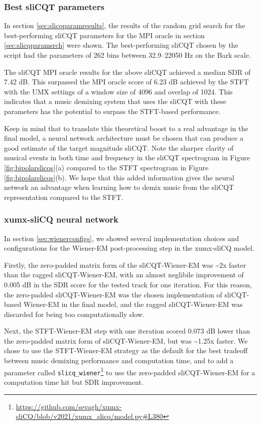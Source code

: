 \documentclass[report.tex]{subfiles}
\begin{document}
\subsubsection{Best sliCQT parameters}

In section \ref{sec:slicqparamresults}, the results of the random grid search for the best-performing sliCQT parameters for the MPI oracle in section \ref{sec:slicqparamsrch} were shown. The best-performing sliCQT chosen by the script had the parameters of 262 bins between 32.9--22050 Hz on the Bark scale.

The sliCQT MPI oracle results for the above sliCQT achieved a median SDR of 7.42 dB. This surpassed the MPI oracle score of 6.23 dB achieved by the STFT with the UMX settings of a window size of 4096 and overlap of 1024. This indicates that a music demixing system that uses the sliCQT with these parameters has the potential to surpass the STFT-based performance.

Keep in mind that to translate this theoretical boost to a real advantage in the final model, a neural network architecture must be chosen that can produce a good estimate of the target magnitude sliCQT. Note the sharper clarity of musical events in both time and frequency in the sliCQT spectrogram in Figure \ref{fig:bipolarslicqs}(a) compared to the STFT spectrogram in Figure \ref{fig:bipolarslicqs}(b). We hope that this added information gives the neural network an advantage when learning how to demix music from the sliCQT representation compared to the STFT.

\subsubsection{xumx-sliCQ neural network}
\label{sec:netdiscuss}

In section \ref{sec:wienerconfigs}, we showed several implementation choices and configurations for the Wiener-EM post-processing step in the xumx-sliCQ model.

Firstly, the zero-padded matrix form of the sliCQT-Wiener-EM was \textasciitilde2x faster than the ragged sliCQT-Wiener-EM, with an almost neglibile improvement of 0.005 dB in the SDR score for the tested track for one iteration. For this reason, the zero-padded sliCQT-Wiener-EM was the chosen implementation of sliCQT-based Wiener-EM in the final model, and the ragged sliCQT-Wiener-EM was discarded for being too computationally slow.

Next, the STFT-Wiener-EM step with one iteration scored 0.073 dB lower than the zero-padded matrix form of sliCQT-Wiener-EM, but was \textasciitilde1.25x faster. We chose to use the STFT-Wiener-EM strategy as the default for the best tradeoff between music demixing performance and computation time, and to add a parameter called \Verb#slicq_wiener#\footnote{\url{https://github.com/sevagh/xumx-sliCQ/blob/v2021/xumx_slicq/model.py\#L380}} to use the zero-padded sliCQT-Wiener-EM for a computation time hit but SDR improvement.
\end{document}
